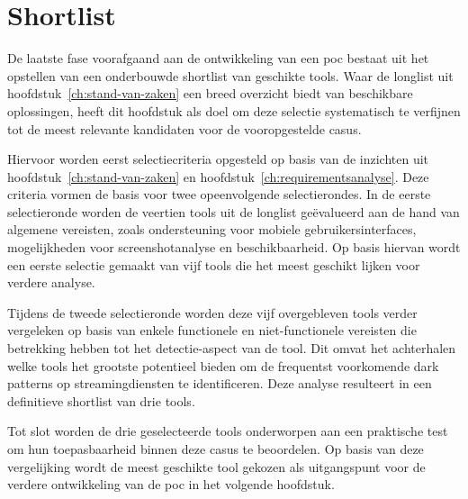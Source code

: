 
\chapter{Shortlist}%
\label{ch:shortlist}

De laatste fase voorafgaand aan de ontwikkeling van een \acrshort{poc} bestaat uit het opstellen van een onderbouwde shortlist van geschikte tools. Waar de longlist uit hoofdstuk~\ref{ch:stand-van-zaken} een breed overzicht biedt van beschikbare oplossingen, heeft dit hoofdstuk als doel om deze selectie systematisch te verfijnen tot de meest relevante kandidaten voor de vooropgestelde casus.

\vspace{1em}

Hiervoor worden eerst selectiecriteria opgesteld op basis van de inzichten uit hoofdstuk~\ref{ch:stand-van-zaken} en hoofdstuk~\ref{ch:requirementsanalyse}. Deze criteria vormen de basis voor twee opeenvolgende selectierondes. In de eerste selectieronde worden de veertien tools uit de longlist geëvalueerd aan de hand van algemene vereisten, zoals ondersteuning voor mobiele gebruikersinterfaces, mogelijkheden voor screenshotanalyse en beschikbaarheid. Op basis hiervan wordt een eerste selectie gemaakt van vijf tools die het meest geschikt lijken voor verdere analyse.

\vspace{1em}

Tijdens de tweede selectieronde worden deze vijf overgebleven tools verder vergeleken op basis van enkele functionele en niet-functionele vereisten die betrekking hebben tot het detectie-aspect van de tool. Dit omvat het achterhalen welke tools het grootste potentieel bieden om de frequentst voorkomende dark patterns op streamingdiensten te identificeren. Deze analyse resulteert in een definitieve shortlist van drie tools.

\vspace{1em}

Tot slot worden de drie geselecteerde tools onderworpen aan een praktische test om hun toepasbaarheid binnen deze casus te beoordelen. Op basis van deze vergelijking wordt de meest geschikte tool gekozen als uitgangspunt voor de verdere ontwikkeling van de \acrshort{poc} in het volgende hoofdstuk.

\newpage

